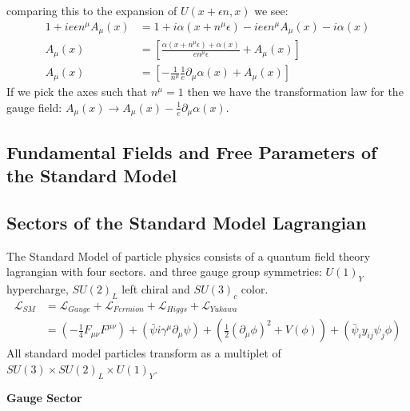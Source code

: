 comparing this to the expansion of $U(x+\epsilon n, x)$ we see:
\begin{align*}
1 + ie\epsilon n^\mu A_\mu (x) &= 1 + i \alpha (x+n^\mu\epsilon ) - ie \epsilon n^\mu A_\mu(x) - i\alpha(x)\\
A_\mu(x) &=  \left [ \frac{\alpha(x+n^\mu\epsilon) + \alpha(x)}{en^\mu \epsilon} + A_\mu(x) \right] \\
A_\mu(x) &=  \left [ -\frac{1}{n^\mu}\frac{1}{e}\partial_\mu \alpha(x) + A_\mu(x) \right]
\end{align*}
If we pick the axes such that $n^\mu = 1$ then we have the transformation law for the gauge field: $A_\mu(x) \rightarrow A_\mu(x) - \frac{1}{e} \partial_\mu \alpha(x)$.

\subsection{Fundamental Fields and Free Parameters of the Standard Model}


\subsection{Sectors of the Standard Model Lagrangian}
The Standard Model of particle physics consists of a quantum field theory lagrangian with four sectors. and three gauge group symmetries: $U(1)_Y$ hypercharge, 
$SU(2)_L$ left chiral and $SU(3)_c$ color. 
\begin{align*}
\mathcal{L}_{SM} &= \mathcal{L}_{Gauge} + \mathcal{L}_{Fermion} + \mathcal{L}_{Higgs} + \mathcal{L}_{Yukawa}\\
&=\left(-\frac{1}{4} F_{\mu\nu}F^{\mu\nu} \right )
  + \left (\bar\psi i\gamma^\mu \partial_\mu \psi \right) +
 \left(\frac{1}{2}(\partial_\mu \phi)^2 + V(\phi) \right) + \left(\bar \psi_i y_{ij} \psi_j \phi \right ) 
\end{align*}
All standard model particles transform as a multiplet of $SU(3) \times SU(2)_L \times U(1)_Y$.

\textbf{Gauge Sector}

